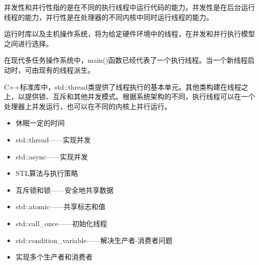 并发性和并行性指的是在不同的执行线程中运行代码的能力。并发性是在后台运行线程的能力，并行性是在处理器的不同内核中同时运行线程的能力。

运行时库以及主机操作系统，将为给定硬件环境中的线程，在并发和并行执行模型之间进行选择。

在现代多任务操作系统中，main()函数已经代表了一个执行线程。当一个新线程启动时，可由现有的线程派生。

C++标准库中，std::thread类提供了线程执行的基本单元。其他类构建在线程之上，以提供锁、互斥和其他并发模式。根据系统架构的不同，执行线程可以在一个处理器上并发运行，也可以在不同的内核上并行运行。


\begin{itemize}
\item 
休眠一定的时间

\item 
std::thread——实现并发

\item 
std::async——实现并发

\item 
STL算法与执行策略

\item 
互斥锁和锁——安全地共享数据

\item 
std::atomic——共享标志和值

\item 
std::call\_once——初始化线程

\item 
std::condition\_variable——解决生产者-消费者问题

\item 
实现多个生产者和消费者
\end{itemize}